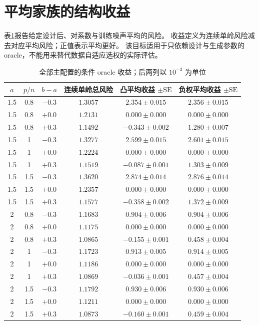 \documentclass[UTF8,fontset=fandol,11pt,a4paper]{ctexart}
\begin{document}
\section{平均家族的结构收益}
表\ref{tab:oracle}报告给定设计后、对系数与训练噪声平均的风险。
收益定义为连续单岭风险减去对应平均风险；正值表示平均更好。
该目标适用于只依赖设计与生成参数的 oracle，不能用来替代数据自适应选权的实际评估。
\begin{table}[htbp]\centering\small
\caption{全部主配置的条件 oracle 收益；后两列以 $10^{-3}$ 为单位}\label{tab:oracle}
\renewcommand{\arraystretch}{1.12}
\begin{tabular}{cccccc}\toprule
$a$ & $p/n$ & $b-a$ & 连续单岭总风险 & 凸平均收益 $\pm\mathrm{SE}$ & 负权平均收益 $\pm\mathrm{SE}$\\\midrule
1.5 & 0.8 & $-0.3$ & $1.3057$ & $2.354\pm0.015$ & $2.356\pm0.015$ \\
1.5 & 0.8 & $+0.0$ & $1.2131$ & $0.000\pm0.000$ & $0.000\pm0.000$ \\
1.5 & 0.8 & $+0.3$ & $1.1492$ & $-0.343\pm0.002$ & $1.280\pm0.007$ \\
1.5 & 1 & $-0.3$ & $1.3277$ & $2.599\pm0.015$ & $2.601\pm0.015$ \\
1.5 & 1 & $+0.0$ & $1.2224$ & $0.000\pm0.000$ & $0.000\pm0.000$ \\
1.5 & 1 & $+0.3$ & $1.1519$ & $-0.087\pm0.001$ & $1.303\pm0.009$ \\
1.5 & 1.5 & $-0.3$ & $1.3620$ & $2.874\pm0.014$ & $2.876\pm0.014$ \\
1.5 & 1.5 & $+0.0$ & $1.2357$ & $0.000\pm0.000$ & $0.000\pm0.000$ \\
1.5 & 1.5 & $+0.3$ & $1.1577$ & $-0.358\pm0.002$ & $1.372\pm0.009$ \\
2 & 0.8 & $-0.3$ & $1.1683$ & $0.904\pm0.006$ & $0.904\pm0.006$ \\
2 & 0.8 & $+0.0$ & $1.1175$ & $0.000\pm0.000$ & $0.000\pm0.000$ \\
2 & 0.8 & $+0.3$ & $1.0865$ & $-0.155\pm0.001$ & $0.458\pm0.004$ \\
2 & 1 & $-0.3$ & $1.1723$ & $0.913\pm0.005$ & $0.914\pm0.005$ \\
2 & 1 & $+0.0$ & $1.1186$ & $0.000\pm0.000$ & $0.000\pm0.000$ \\
2 & 1 & $+0.3$ & $1.0869$ & $-0.036\pm0.001$ & $0.457\pm0.004$ \\
2 & 1.5 & $-0.3$ & $1.1792$ & $0.930\pm0.006$ & $0.930\pm0.006$ \\
2 & 1.5 & $+0.0$ & $1.1211$ & $0.000\pm0.000$ & $0.000\pm0.000$ \\
2 & 1.5 & $+0.3$ & $1.0873$ & $-0.160\pm0.001$ & $0.459\pm0.004$ \\
\bottomrule\end{tabular}
\par{}
\end{table}
\end{document}
